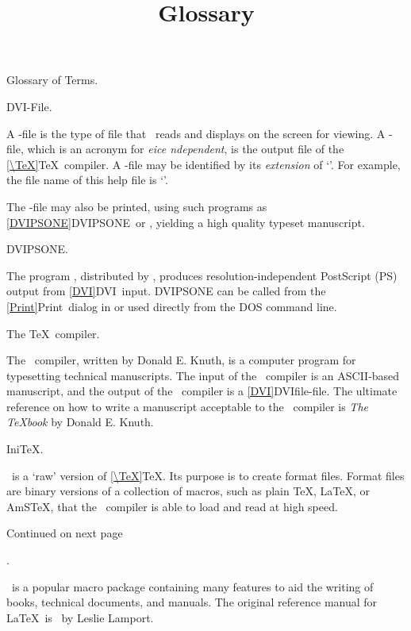 \parskip0pt

\title{Glossary}Glossary of Terms.

DVI-File.

A -file is the type of file that \ reads and
displays on the screen for viewing.  A -file, which is an
acronym for {\it{}eice
ndependent}, is the output file of the \ref{\TeX}{TeX}\
compiler.  A -file may be identified by its {\it extension\/} of
`\key{.dvi}'.  For example, the file name of this help file is
`'. %
   \bigskip

The -file may also be printed, using such programs as
\ref{DVIPSONE}{DVIPSONE}\ or , yielding a high quality 
typeset manuscript.
   \bigskip

DVIPSONE.

The program , distributed by , produces
resolution-independent PostScript (PS) output from \ref{DVI}{DVI}\ input.
DVIPSONE can be called from the \ref{Print}{Print}\ 
dialog in  or used directly from the DOS command line.
   \bigskip

The \TeX\ compiler.

The \hb{\TeX}\ compiler, written by Donald E. Knuth, is a computer program
for typesetting technical manuscripts.  The input of the \hb{\TeX}\
compiler is an ASCII-based manuscript, and the output of the \hb{\TeX}\
compiler is a \ref{DVI}{DVIfile}-file.  The ultimate reference on how to
write a manuscript acceptable to the \hb{\TeX}\ compiler is {\sl The
\TeX{}book} by Donald E. Knuth.
   \bigskip
   
\altsec{iniTeX}Ini\TeX.

\ is a `raw' %
version of \ref{\TeX}{TeX}.  Its purpose
is to create format files.  Format files are binary versions of a
collection of macros, such as plain \TeX, \LaTeX, or AmS\TeX, that the
\hb{\TeX}\ compiler is able to load and read at high speed.

	\medskip

Continued on next page\ellipses

\newpage


\altsec{LaTeX}\LaTeXbf.	%

\hb{\LaTeX}\ is a popular macro package containing many features to aid
the writing of books, technical documents, and manuals.  The
original reference manual for \LaTeX\ is %
\LaTeXsl\ by Leslie Lamport.
   \bigskip

